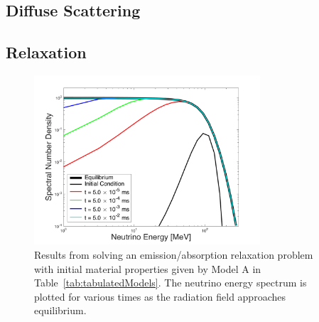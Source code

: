 \documentclass[10pt,preprint]{aastex}
\begin{document}
\subsection{Diffuse Scattering}

\subsection{Relaxation}

\begin{figure}
  \begin{center}
    \includegraphics[width=0.75\textwidth]{./Figures/RelaxationEmissionAbsorption_Spectra_ModelA}
  \end{center}
  \caption{Results from solving an emission/absorption relaxation problem with initial material properties given by Model A in Table~\ref{tab:tabulatedModels}.  
  The neutrino energy spectrum is plotted for various times as the radiation field approaches equilibrium.}
  \label{fig:RelaxationEmissionAbsorption}
\end{figure}
\end{document}
